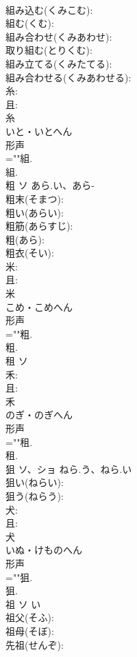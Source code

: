\documentclass[8pt]{extreport}
\begin{document}
\begin{CJK}{UTF8}{min}
\\	組み込む(くみこむ): 
\\	組む(くむ): 
\\	組み合わせ(くみあわせ): 
\\	取り組む(とりくむ): 
\\	組み立てる(くみたてる): 
\\	組み合わせる(くみあわせる): 
\\	糸: 
\\	且: 
\\	糸	
\\	いと・いとへん	
\\	形声 
\\	=""組.
\\	組.
\\	粗	ソ	あら.い、あら-		
\\	粗末(そまつ): 
\\	粗い(あらい): 
\\	粗筋(あらすじ): 
\\	粗(あら): 
\\	粗衣(そい): 
\\	米: 
\\	且: 
\\	米	
\\	こめ・こめへん	
\\	形声 
\\	=""粗.
\\	粗.
\\	租	ソ			
\\	禾: 
\\	且: 
\\	禾	
\\	のぎ・のぎへん	
\\	形声 
\\	=""租.
\\	租.
\\	狙	ソ、ショ	ねら.う、ねら.い		
\\	狙い(ねらい): 
\\	狙う(ねらう): 
\\	犬: 
\\	且: 
\\	犬	
\\	いぬ・けものへん	
\\	形声 
\\	=""狙.
\\	狙.
\\	祖	ソ		い	
\\	祖父(そふ): 
\\	祖母(そぼ): 
\\	先祖(せんぞ): 

\end{CJK}
\end{document}
